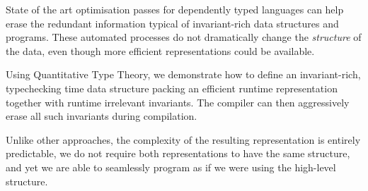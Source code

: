 State of the art optimisation passes for dependently typed languages can help
erase the redundant information typical of invariant-rich data structures and
programs.
These automated processes do not dramatically change the \emph{structure} of
the data, even though more efficient representations could be available.

Using Quantitative Type Theory, we demonstrate how to define an invariant-rich,
typechecking time data structure packing an efficient runtime representation
together with runtime irrelevant invariants. The compiler can then aggressively
erase all such invariants during compilation.

Unlike other approaches, the complexity of the resulting representation is
entirely predictable, we do not require both representations to have the
same structure, and yet we are able to seamlessly program as if we were
using the high-level structure.
